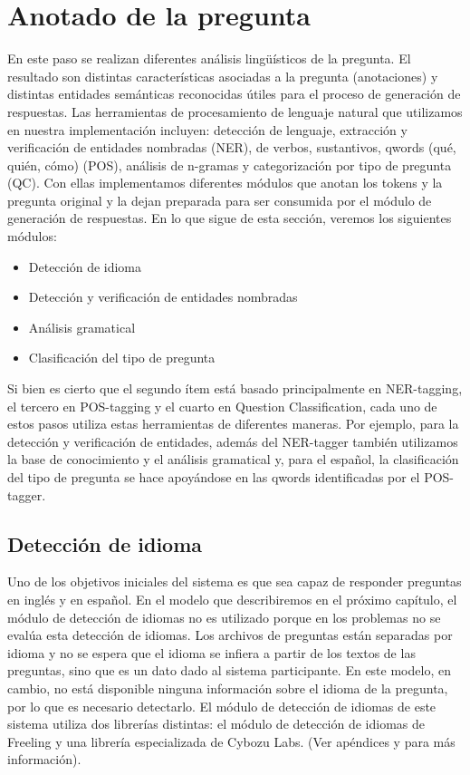 \section{Anotado de la pregunta}
\label{sec:qp-mitic}


En este paso se realizan diferentes análisis lingüísticos de la pregunta. El resultado son distintas características asociadas a la pregunta (anotaciones) y distintas entidades semánticas reconocidas útiles para el proceso de generación de respuestas. 
Las herramientas de procesamiento de lenguaje natural que utilizamos en nuestra implementación incluyen: detección de lenguaje, extracción y verificación de entidades nombradas (NER), de verbos, sustantivos, qwords (qué, quién, cómo) (POS), análisis de n-gramas y categorización por tipo de pregunta (QC).
Con ellas implementamos diferentes módulos que anotan los tokens y la pregunta original y la dejan preparada para ser consumida por el módulo de generación de respuestas. En lo que sigue de esta sección, veremos los siguientes módulos:

\begin{itemize}
\item Detección de idioma 
\item Detección y verificación de entidades nombradas
\item Análisis gramatical
\item Clasificación del tipo de pregunta
\end{itemize}

Si bien es cierto que el segundo ítem está basado principalmente en NER-tagging, el tercero en POS-tagging y el cuarto en Question Classification, 
cada uno de estos pasos utiliza estas herramientas de diferentes maneras. Por ejemplo, para la detección y verificación de entidades, además del NER-tagger también utilizamos la base de conocimiento y el análisis gramatical y, para el español, la clasificación del tipo de pregunta se hace apoyándose en las qwords identificadas por el POS-tagger.

\subsection{Detección de idioma}

Uno de los objetivos iniciales del sistema es que sea capaz de responder preguntas en inglés y en español. En el modelo que describiremos en el próximo capítulo, el módulo de detección de idiomas no es utilizado porque en los problemas no se evalúa esta detección de idiomas. Los archivos de preguntas están separadas por idioma y no se espera que el idioma se infiera a partir de los textos de las preguntas, sino que es un dato dado al sistema participante. En este modelo, en cambio, no está disponible ninguna información sobre el idioma de la pregunta, por lo que es necesario detectarlo. El módulo de detección de idiomas de este sistema utiliza dos librerías distintas: el módulo de detección de idiomas de Freeling y una librería especializada de Cybozu Labs. (Ver apéndices  y  para más información).

